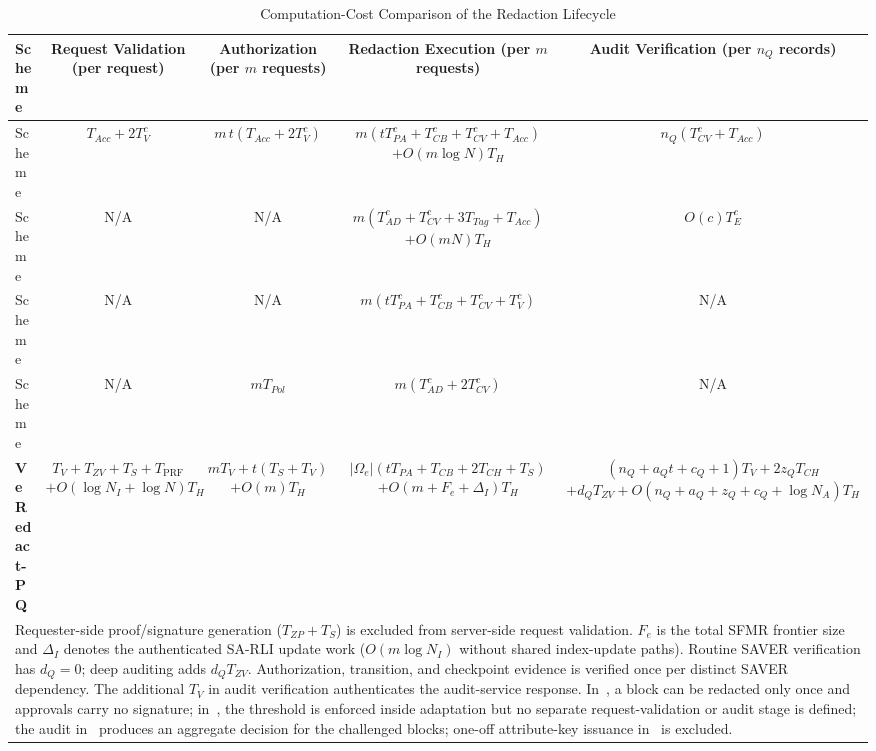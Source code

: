 \documentclass[lettersize,journal]{IEEEtran}
\begin{document}
\begin{table}[t]
\centering
\caption{Computation-Cost Comparison of the Redaction Lifecycle}
\label{tab:comp-cost}
\footnotesize
\renewcommand{\arraystretch}{1.25}
\setlength{\tabcolsep}{3.8pt}
\begin{tabular}{lcccc}
\toprule
\textbf{Scheme} &
\makecell{\textbf{Request Validation}\\\textbf{(per request)}} &
\makecell{\textbf{Authorization}\\\textbf{(per $m$ requests)}} &
\makecell{\textbf{Redaction Execution}\\\textbf{(per $m$ requests)}} &
\makecell{\textbf{Audit Verification}\\\textbf{(per $n_Q$ records)}} \\
\midrule

Scheme~\cite{ref1}
& $T_{Acc}+2T_V^{c}$
& $m\,t(T_{Acc}+2T_V^{c})$
& \makecell{$m(tT_{PA}^{c}+T_{CB}^{c}+T_{CV}^{c}+T_{Acc})$\\
$+O(m\log N)T_H$}
& $n_Q(T_{CV}^{c}+T_{Acc})$ \\

Scheme~\cite{ref13}
& N/A
& N/A
& \makecell{$m(T_{AD}^{c}+T_{CV}^{c}+3T_{Tag}+T_{Acc})$\\
$+O(mN)T_H$}
& $O(c)T_E^{c}$ \\

Scheme~\cite{ref27}
& N/A
& N/A
& $m(tT_{PA}^{c}+T_{CB}^{c}+T_{CV}^{c}+T_V^{c})$
& N/A \\

Scheme~\cite{ref34}
& N/A
& $mT_{Pol}$
& $m(T_{AD}^{c}+2T_{CV}^{c})$
& N/A \\

\midrule
\textbf{VeRedact-PQ}
& \makecell{$T_V+T_{ZV}+T_S+T_{\mathrm{PRF}}$\\
$+O(\log N_I+\log N)T_H$}
& \makecell{$mT_V+t(T_S+T_V)$\\
$+O(m)T_H$}
& \makecell{$|\Omega_e|(tT_{PA}+T_{CB}+2T_{CH}+T_S)$\\
$+O(m+F_e+\Delta_I)T_H$}
& \makecell{$(n_Q+a_Qt+c_Q+1)T_V+2z_QT_{CH}$\\
$+d_QT_{ZV}
+O(n_Q+a_Q+z_Q+c_Q+\log N_A)T_H$} \\

\bottomrule
\multicolumn{5}{p{0.96\textwidth}}{\footnotesize
Requester-side proof/signature generation ($T_{ZP}+T_S$) is excluded
from server-side request validation. $F_e$ is the total SFMR frontier
size and $\Delta_I$ denotes the authenticated SA-RLI update work
($O(m\log N_I)$ without shared index-update paths). Routine SAVER
verification has $d_Q=0$; deep auditing adds $d_QT_{ZV}$.
Authorization, transition, and checkpoint evidence is verified once
per distinct SAVER dependency. The additional $T_V$ in audit
verification authenticates the audit-service response. In~\cite{ref1},
a block can be redacted only once and approvals carry no signature;
in~\cite{ref27}, the threshold is enforced inside adaptation but no
separate request-validation or audit stage is defined; the audit
in~\cite{ref13} produces an aggregate decision for the challenged
blocks; one-off attribute-key issuance in~\cite{ref34} is excluded.}
\end{tabular}
\end{table}
\end{document}
